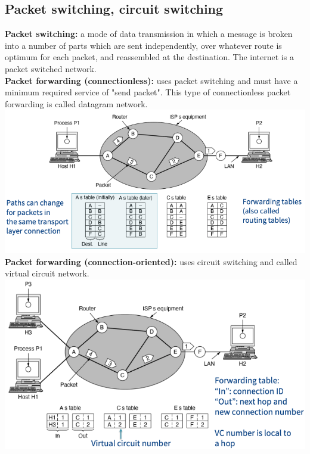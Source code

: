 \subsection{Packet switching, circuit switching}
\textbf{Packet switching:} a mode of data transmission in which a message is broken into a number of parts which are sent independently, over whatever route is optimum for each packet, and reassembled at the destination. The internet is a packet switched network.\\
\textbf{Packet forwarding (connectionless):} uses packet switching and must have a minimum required service of "send packet". This type of connectionless packet forwarding is called datagram network.\\
\includegraphics[width=\linewidth]{figs/packet-forwarding-connectionless.png}\\
\textbf{Packet forwarding (connection-oriented):} uses circuit switching and called virtual circuit network.\\
\includegraphics[width=\linewidth]{figs/packet-forwarding-connection-oriented.png}\\
